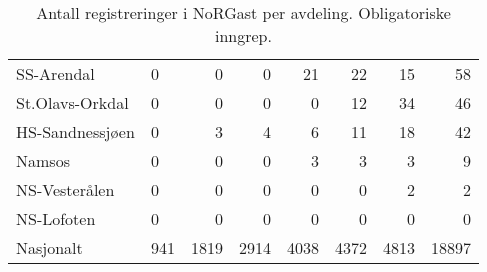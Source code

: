 \documentclass[norsk,a4paper]{article}\usepackage[]{graphicx}\usepackage[]{color}
\begin{document}
\begin{table}[ht]
\begin{tabular}{llrrrrrr}
  SS-Arendal & 0 & 0 & 0 & 21 & 22 & 15 & 58 \\ 
  St.Olavs-Orkdal & 0 & 0 & 0 & 0 & 12 & 34 & 46 \\ 
  HS-Sandnessjøen & 0 & 3 & 4 & 6 & 11 & 18 & 42 \\ 
  Namsos & 0 & 0 & 0 & 3 & 3 & 3 & 9 \\ 
  NS-Vesterålen & 0 & 0 & 0 & 0 & 0 & 2 & 2 \\ 
  NS-Lofoten & 0 & 0 & 0 & 0 & 0 & 0 & 0 \\ 
   \midrule
Nasjonalt & 941 & 1819 & 2914 & 4038 & 4372 & 4813 & 18897 \\ 
   \hline
\end{tabular}
\caption{Antall registreringer i NoRGast per avdeling. Obligatoriske inngrep.} 
\end{table}
\end{document}
